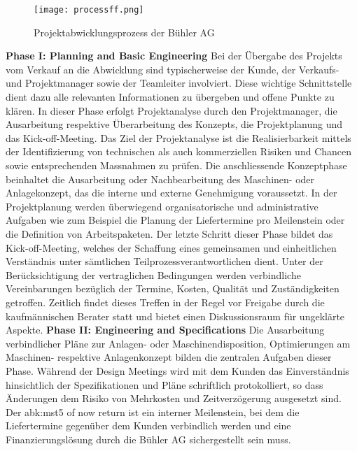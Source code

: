 \begin{figure}[H]
	\centering
	\texttt{[image: processff.png]}
	\caption{Projektabwicklungsprozess der Bühler AG}
	\label{fig: processff}
\end{figure}
\textbf{Phase I: Planning and Basic Engineering}
\newline
Bei der Übergabe des Projekts vom Verkauf an die Abwicklung sind typischerweise der Kunde, der Verkaufs- und Projektmanager sowie der Teamleiter involviert. Diese wichtige Schnittstelle dient dazu alle relevanten Informationen zu übergeben und offene Punkte zu klären. In dieser Phase erfolgt Projektanalyse durch den Projektmanager, die Ausarbeitung respektive Überarbeitung des Konzepts, die Projektplanung und das Kick-off-Meeting. Das Ziel der Projektanalyse ist die Realisierbarkeit mittels der Identifizierung von technischen als auch kommerziellen Risiken und Chancen sowie entsprechenden Massnahmen zu prüfen. Die anschliessende Konzeptphase beinhaltet die Ausarbeitung oder Nachbearbeitung des Maschinen- oder Anlagekonzept, das die interne und  externe Genehmigung voraussetzt. In der Projektplanung werden überwiegend organisatorische und administrative Aufgaben wie zum Beispiel die Planung der Liefertermine pro Meilenstein oder die Definition von Arbeitspaketen. Der letzte Schritt dieser Phase bildet das Kick-off-Meeting, welches der Schaffung eines gemeinsamen und einheitlichen Verständnis unter sämtlichen Teilprozessverantwortlichen dient. Unter der Berücksichtigung der vertraglichen Bedingungen werden verbindliche Vereinbarungen bezüglich der Termine, Kosten, Qualität und Zuständigkeiten getroffen. Zeitlich findet dieses Treffen in der Regel vor Freigabe durch die kaufmännischen Berater statt und bietet einen Diskussionsraum für ungeklärte Aspekte.
\newline\newline
\textbf{Phase II: Engineering and Specifications}
\newline
Die Ausarbeitung verbindlicher Pläne zur Anlagen- oder Maschinendisposition, Optimierungen am Maschinen- respektive Anlagenkonzept bilden die zentralen Aufgaben dieser Phase. Während der Design Meetings wird mit dem Kunden das Einverständnis hinsichtlich der Spezifikationen und Pläne schriftlich protokolliert, so dass Änderungen dem Risiko von Mehrkosten und Zeitverzögerung ausgesetzt sind. Der \gls{abk:mst}5 \glqqPoint of now return\grqq{ } ist ein interner Meilenstein, bei dem die Liefertermine gegenüber dem Kunden verbindlich werden und eine Finanzierungslösung durch die Bühler AG sichergestellt sein muss.
